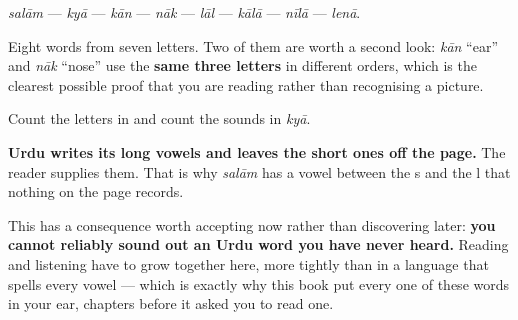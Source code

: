 \begin{quote}
\end{quote}

\begin{quote}
\end{quote}

\begin{quote}
\end{quote}

\begin{quote}
\end{quote}

\begin{quote}
\end{quote}

\begin{quote}
\end{quote}

\emph{salām} — \emph{kyā} — \emph{kān} — \emph{nāk} — \emph{lāl} — \emph{kālā} — \emph{nīlā} — \emph{lenā}.

Eight words from seven letters. Two of them are worth a second look: \textbf{} \emph{kān} \textquotedblleft{}ear\textquotedblright{} and \textbf{} \emph{nāk} \textquotedblleft{}nose\textquotedblright{} use the \textbf{same three letters} in different orders, which is the clearest possible proof that you are reading rather than recognising a picture.

\begin{culture}
Count the letters in \textbf{} and count the sounds in \emph{kyā}.

\textbf{Urdu writes its long vowels and leaves the short ones off the page.} The reader supplies them. That is why \emph{salām} has a vowel between the s and the l that nothing on the page records.

This has a consequence worth accepting now rather than discovering later: \textbf{you cannot reliably sound out an Urdu word you have never heard.} Reading and listening have to grow together here, more tightly than in a language that spells every vowel — which is exactly why this book put every one of these words in your ear, chapters before it asked you to read one.
\end{culture}

